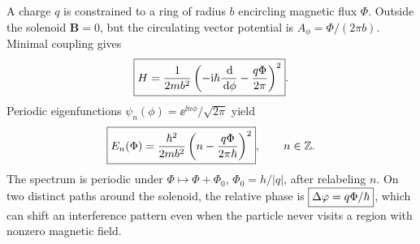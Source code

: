 A charge $q$ is constrained to a ring of
radius $b$ encircling magnetic flux $\Phi$.
Outside the solenoid $\mathbf B=0$, but
the circulating vector potential is
$A_\phi=\Phi/(2\pi b)$.
Minimal coupling gives
\begin{equation}
\boxed{H=\frac1{2mb^2}
\left(-\mathrm i\hbar\frac{\,\mathrm d}{\,\mathrm d\phi}
-\frac{q\Phi}{2\pi}\right)^2}.
\end{equation}
Periodic eigenfunctions
$\psi_n(\phi)=\ee^{\ii n\phi}/\sqrt{2\pi}$
yield
\begin{equation}
\boxed{E_n(\Phi)=\frac{\hbar^2}{2mb^2}
\left(n-\frac{q\Phi}{2\pi\hbar}\right)^2},
\qquad n\in\mathbb Z.
\end{equation}
The spectrum is periodic under
$\Phi\mapsto\Phi+\Phi_0$,
$\Phi_0=h/|q|$, after relabeling $n$.
On two distinct paths around the solenoid,
the relative phase is
$\boxed{\Delta\varphi=q\Phi/\hbar}$,
which can shift an interference pattern
even when the particle never visits a region
with nonzero magnetic field.
